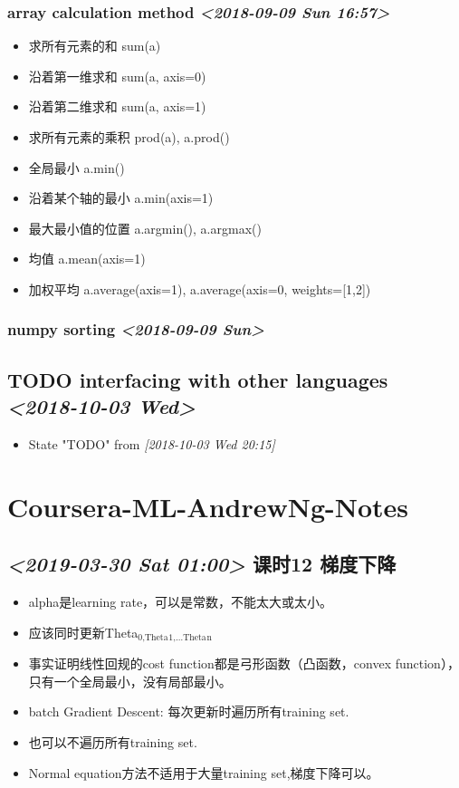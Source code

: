 \documentclass[11pt]{article}
\begin{document}
\subsubsection{array calculation method \textit{<2018-09-09 Sun 16:57>}}
\label{sec:org6da5cb8}
\begin{itemize}
\item 求所有元素的和 sum(a)
\item 沿着第一维求和 sum(a, axis=0)
\item 沿着第二维求和 sum(a, axis=1)
\item 求所有元素的乘积 prod(a), a.prod()
\item 全局最小 a.min()
\item 沿着某个轴的最小 a.min(axis=1)
\item 最大最小值的位置 a.argmin(), a.argmax()
\item 均值 a.mean(axis=1)
\item 加权平均 a.average(axis=1), a.average(axis=0, weights=[1,2])
\end{itemize}
\subsubsection{numpy sorting \textit{<2018-09-09 Sun>}}
\label{sec:org236b0f3}
\subsection{{\bfseries\sffamily TODO} interfacing with other languages \textit{<2018-10-03 Wed>}}
\label{sec:org3a109b1}
\begin{itemize}
\item State "TODO"       from              \textit{[2018-10-03 Wed 20:15]}
\end{itemize}
\section{Coursera-ML-AndrewNg-Notes}
\label{sec:orgd48c406}
\subsection{\textit{<2019-03-30 Sat 01:00> } 课时12 梯度下降}
\label{sec:orgecaa62c}
\begin{itemize}
\item alpha是learning rate，可以是常数，不能太大或太小。
\item 应该同时更新Theta\(_{\text{0,Theta}}\)\(_{\text{1,\ldots{}Theta}}\)\(_{\text{n}}\)
\item 事实证明线性回规的cost function都是弓形函数（凸函数，convex function），
只有一个全局最小，没有局部最小。
\item batch Gradient Descent: 每次更新时遍历所有training set.
\item 也可以不遍历所有training set.
\item Normal equation方法不适用于大量training set,梯度下降可以。
\end{itemize}
\end{document}
